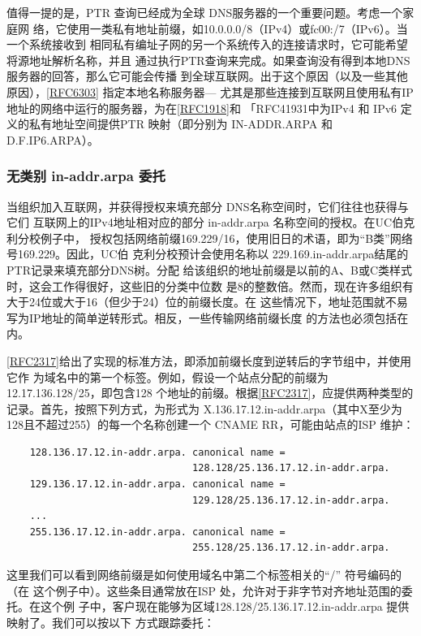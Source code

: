 值得一提的是，PTR 查询已经成为全球 DNS服务器的一个重要问题。考虑一个家庭网
络，它使用一类私有地址前缀，如10.0.0.0/8（IPv4）或fc00:/7（IPv6）。当一个系统接收到
相同私有编址子网的另一个系统传入的连接请求时，它可能希望将源地址解析名称，并且
通过执行PTR查询来完成。如果查询没有得到本地DNS服务器的回答，那么它可能会传播
到全球互联网。出于这个原因（以及一些其他原因），\href{https://www.rfc-editor.org/rfc/rfc6303}{[RFC6303]}
指定本地名称服务器—
尤其是那些连接到互联网且使用私有IP地址的网络中运行的服务器，为在\href{https://www.rfc-editor.org/rfc/rfc1918}{[RFC1918]}和
「RFC41931中为IPv4 和 IPv6 定义的私有地址空间提供PTR 映射（即分别为 IN-ADDR.ARPA
和 D.F.IP6.ARPA）。

\subsubsection{无类别 in-addr.arpa 委托}

当组织加入互联网，并获得授权来填充部分 DNS名称空间时，它们往往也获得与它们
互联网上的IPv4地址相对应的部分 in-addr.arpa 名称空间的授权。在UC伯克利分校例子中，
授权包括网络前缀169.229/16，使用旧日的术语，即为“B类”网络号169.229。因此，UC伯
克利分校预计会使用名称以 229.169.in-addr.arpa结尾的PTR记录来填充部分DNS树。分配
给该组织的地址前缀是以前的A、B或C类样式时，这会工作得很好，这些旧的分类中位数
是8的整数倍。然而，现在许多组织有大于24位或大于16（但少于24）位的前缀长度。在
这些情况下，地址范围就不易写为IP地址的简单逆转形式。相反，一些传输网络前缀长度
的方法也必须包括在内。

\href{https://www.rfc-editor.org/rfc/rfc2317}{[RFC2317]}给出了实现的标准方法，即添加前缀长度到逆转后的字节组中，并使用它作
为域名中的第一个标签。例如，假设一个站点分配的前缀为12.17.136.128/25，即包含128
个地址的前缀。根据\href{https://www.rfc-editor.org/rfc/rfc2317}{[RFC2317]}，应提供两种类型的记录。首先，按照下列方式，为形式为
X.136.17.12.in-addr.arpa（其中X至少为128且不超过255）的每一个名称创建一个 CNAME
RR，可能由站点的ISP 维护：

\begin{verbatim}
    128.136.17.12.in-addr.arpa. canonical name =
                                128.128/25.136.17.12.in-addr.arpa.
    129.136.17.12.in-addr.arpa. canonical name =
                                129.128/25.136.17.12.in-addr.arpa.
    ...
    255.136.17.12.in-addr.arpa. canonical name =
                                255.128/25.136.17.12.in-addr.arpa.
\end{verbatim}

这里我们可以看到网络前缀是如何使用域名中第二个标签相关的“/” 符号编码的（在
这个例子中）。这些条目通常放在ISP 处，允许对于非字节对齐地址范围的委托。在这个例
子中，客户现在能够为区域128.128/25.136.17.12.in-addr.arpa 提供映射了。我们可以按以下
方式跟踪委托：

